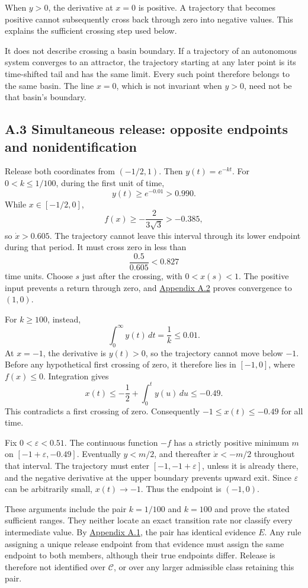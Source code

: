 When \(y>0\), the derivative at \(x=0\) is positive. A trajectory that becomes positive cannot subsequently cross back through zero into negative values. This explains the sufficient crossing step used below.

It does not describe crossing a basin boundary. If a trajectory of an autonomous system converges to an attractor, the trajectory starting at any later point is its time-shifted tail and has the same limit. Every such point therefore belongs to the same basin. The line \(x=0\), which is not invariant when \(y>0\), need not be that basin’s boundary.

\subsection*{A.3 Simultaneous release: opposite endpoints and nonidentification}\label{app:a.3}

Release both coordinates from \((-1/2,1)\). Then \(y(t)=e^{-kt}\). For \(0<k\leq1/100\), during the first unit of time,
\[
y(t)\geq e^{-0.01}>0.990.
\]
While \(x\in[-1/2,0]\),
\[
f(x)\geq-\frac{2}{3\sqrt3}>-0.385,
\]
so \(\dot x>0.605\). The trajectory cannot leave this interval through its lower endpoint during that period. It must cross zero in less than
\[
\frac{0.5}{0.605}<0.827
\]
time units. Choose \(s\) just after the crossing, with \(0<x(s)<1\). The positive input prevents a return through zero, and \hyperref[app:a.2]{Appendix A.2} proves convergence to \((1,0)\).

For \(k\geq100\), instead,
\[
\int_0^\infty y(t)\,dt=\frac1k\leq0.01.
\]
At \(x=-1\), the derivative is \(y(t)>0\), so the trajectory cannot move below \(-1\). Before any hypothetical first crossing of zero, it therefore lies in \([-1,0]\), where \(f(x)\leq0\). Integration gives
\[
x(t)\leq-\frac12+\int_0^t y(u)\,du\leq-0.49.
\]
This contradicts a first crossing of zero. Consequently \(-1\leq x(t)\leq-0.49\) for all time.

Fix \(0<\varepsilon<0.51\). The continuous function \(-f\) has a strictly positive minimum \(m\) on \([-1+\varepsilon,-0.49]\). Eventually \(y<m/2\), and thereafter \(\dot x<-m/2\) throughout that interval. The trajectory must enter \([-1,-1+\varepsilon]\), unless it is already there, and the negative derivative at the upper boundary prevents upward exit. Since \(\varepsilon\) can be arbitrarily small, \(x(t)\to-1\). Thus the endpoint is \((-1,0)\).

These arguments include the pair \(k=1/100\) and \(k=100\) and prove the stated sufficient ranges. They neither locate an exact transition rate nor classify every intermediate value. By \hyperref[app:a.1]{Appendix A.1}, the pair has identical evidence \(E\). Any rule assigning a unique release endpoint from that evidence must assign the same endpoint to both members, although their true endpoints differ. Release is therefore not identified over \(\mathcal C\), or over any larger admissible class retaining this pair.


